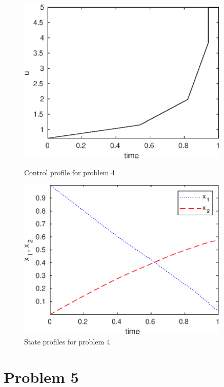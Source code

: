 \begin{figure}[htb]
\begin{minipage}[t]{0.5\linewidth}
\centering
\includegraphics[width=0.9\textwidth]{examples/problem4/graphs/u_624a.eps}
\caption[Problem 4: Control profile]{Control profile for problem 4}
\label{fig:prob4_u}  
\end{minipage}
\begin{minipage}[t]{0.5\linewidth}
\centering
\includegraphics[width=0.9\textwidth]{examples/problem4/graphs/x12_624a.eps}
\caption[Problem 4: State profiles]{State profiles for problem 4}
\label{fig:prob4_x} 
\end{minipage}
\end{figure}
 
\section{Problem 5}
\label{sec:prob5}

